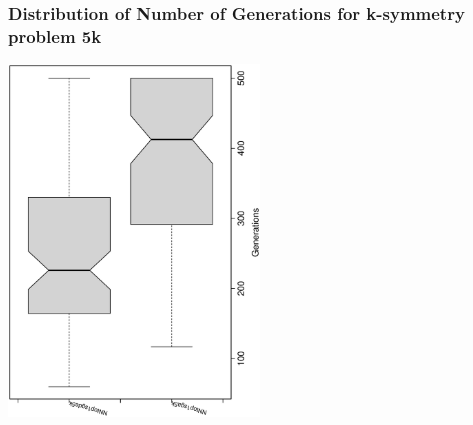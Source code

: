  \begin{frame}
 \frametitle{ Distribution of Number of Generations for k-symmetry problem 5k }
 \begin{center}
\includegraphics[width=0.5\textwidth, angle=-90]
{ExpDboxplottGenerations003.eps}
 \end{center}
 \label{ExpDboxplottGenerations003.eps}  
 \end{frame}

